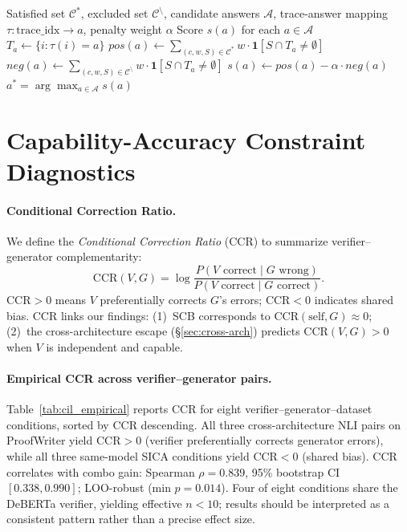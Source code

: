 \begin{algorithm}[h]
\caption{Source-Trace Attribution Scoring}
\label{alg:scorer}
\begin{algorithmic}[1]
\Require Satisfied set $\mathcal{C}^*$, excluded set $\mathcal{C}^{\setminus}$, candidate answers $\mathcal{A}$, trace-answer mapping $\tau: \text{trace\_idx} \to a$, penalty weight $\alpha$
\Ensure Score $s(a)$ for each $a \in \mathcal{A}$
    \State $T_a \gets \{i : \tau(i) = a\}$ 
    \State $\textit{pos}(a) \gets \sum_{(c,w,S) \in \mathcal{C}^*} w \cdot \mathbf{1}[S \cap T_a \neq \emptyset]$
    \State $\textit{neg}(a) \gets \sum_{(c,w,S) \in \mathcal{C}^{\setminus}} w \cdot \mathbf{1}[S \cap T_a \neq \emptyset]$
    \State $s(a) \gets \textit{pos}(a) - \alpha \cdot \textit{neg}(a)$
\EndFor
\State \Return $a^* = \arg\max_{a \in \mathcal{A}} s(a)$
\end{algorithmic}
\end{algorithm}


\section{Capability-Accuracy Constraint Diagnostics}
\label{app:diagnostics}
\label{app:cil}

\paragraph{Conditional Correction Ratio.}
We define the \textit{Conditional Correction Ratio} (CCR) to summarize verifier--generator complementarity:
\begin{equation}
\label{eq:cil}
\text{CCR}(V, G) = \log \frac{P(V \text{ correct} \mid G \text{ wrong})}{P(V \text{ correct} \mid G \text{ correct})}.
\end{equation}
$\text{CCR} > 0$ means $V$ preferentially corrects $G$'s errors; $\text{CCR} < 0$ indicates shared bias. CCR links our findings: (1)~SCB corresponds to $\text{CCR}(\text{self}, G) \approx 0$; (2)~the cross-architecture escape (\S\ref{sec:cross-arch}) predicts $\text{CCR}(V, G) > 0$ when $V$ is independent and capable.

\paragraph{Empirical CCR across verifier--generator pairs.}
Table~\ref{tab:cil_empirical} reports CCR for eight verifier--generator--dataset conditions, sorted by CCR descending. All three cross-architecture NLI pairs on ProofWriter yield $\text{CCR} > 0$ (verifier preferentially corrects generator errors), while all three same-model SICA conditions yield $\text{CCR} < 0$ (shared bias). CCR correlates with combo gain: Spearman $\rho = 0.839$, 95\% bootstrap CI $[0.338, 0.990]$; LOO-robust (min $p = 0.014$). Four of eight conditions share the DeBERTa verifier, yielding effective $n < 10$; results should be interpreted as a consistent pattern rather than a precise effect size.

